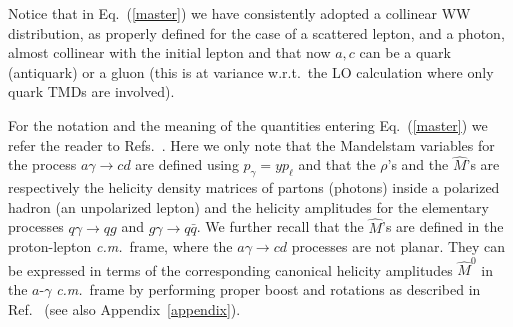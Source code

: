 \documentclass[nofootinbib,superscriptaddress,aps]{revtex4}
\begin{document}
Notice that in Eq.~(\ref{master}) we have consistently adopted a collinear WW distribution, as properly defined for the case of a scattered lepton, and a photon, almost collinear with the initial lepton and that now $a,c$ can be a quark (antiquark) or a gluon (this is at variance w.r.t.~the LO calculation where only quark TMDs are involved).

For the notation and the meaning of the quantities entering Eq.~(\ref{master}) we refer the reader to Refs.~\cite{Anselmino:2009pn,Anselmino:2005sh}. Here we only note that the Mandelstam variables for the process $a\gamma\to c d$ are defined using $p_\gamma = y p_\ell$ and that the $\rho$'s and the $\hat M$'s are respectively the helicity density matrices of partons (photons) inside a polarized hadron (an unpolarized lepton) and the helicity amplitudes for the elementary processes $q\gamma\to q g$ and $g\gamma\to q\bar q$. We further recall that the $\hat M$'s are defined in the proton-lepton  \emph{c.m.}~frame, where the $a\gamma\to cd$ processes are not planar. They can be expressed in terms of the corresponding canonical helicity amplitudes $\hat M^0$ in the $a$-$\gamma$ \emph{c.m.}~frame by performing proper boost and rotations as described in Ref.~\cite{Anselmino:2004ky,Anselmino:2005sh} (see also Appendix~\ref{appendix}).
\end{document}
